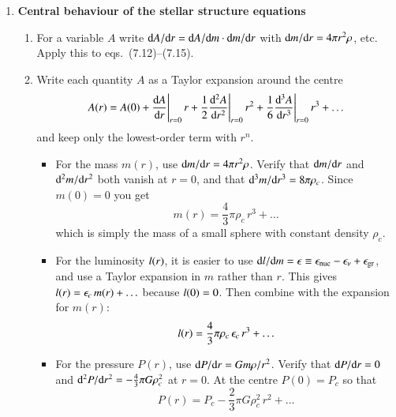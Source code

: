 \documentclass[11pt,a4paper,fleqn]{report}
\begin{document}
\begin{enumerate}
\item {\bf Central behaviour of the stellar structure equations}
  \begin{enumerate}
   
  \item For a variable $A$ write $\mathrm{d} A/\mathrm{d} r = \mathrm{d} A/\mathrm{d} m \cdot
    \mathrm{d} m/\mathrm{d} r$ with $\mathrm{d} m/\mathrm{d} r = 4\pi r^2 \rho$, etc. Apply
    this to eqs.~(7.12)--(7.15).

  \item Write each quantity $A$ as a Taylor expansion around the centre
    \[
    A(r) = A(0) + \frac{\mathrm{d} A}{\mathrm{d} r}\Bigg|_{r=0} \,r
    + \frac{1}{2} \frac{\mathrm{d}^2 A}{\mathrm{d} r^2}\Bigg|_{r=0} \,r^2
    + \frac{1}{6} \frac{\mathrm{d}^3 A}{\mathrm{d} r^3}\Bigg|_{r=0} \,r^3 
    + \dots
    \]
    and keep only the lowest-order term with $r^n$.
    
    \begin {itemize} 

    \item For the mass $m(r)$, use $\mathrm{d} m/\mathrm{d} r = 4\pi r^2 \rho$.
      Verify that $\mathrm{d} m/\mathrm{d} r$ and $\mathrm{d}^2 m/\mathrm{d} r^2$ both vanish
      at $r=0$, and that $\mathrm{d}^3 m/\mathrm{d} r^3 = 8\pi \rho_c$. Since
      $m(0) = 0$ you get
      \[
      m(r) = \frac{4}{3}\pi \rho_c\, r^3 + \ldots
      \]
      which  is simply the mass of a small sphere with constant
      density $\rho_c$.

    \item For the luminosity $l(r)$, it is easier to use
      $\mathrm{d}l/\mathrm{d} m = \epsilon \equiv \epsilon_\mathrm{nuc} -
      \epsilon_\nu + \epsilon_\mathrm{gr}$, and use a Taylor expansion
      in $m$ rather than $r$. This gives $l(r) = \epsilon_c\, m(r)
      + \ldots$ because $l(0) = 0$.  Then combine with the
      expansion for $m(r)$:
      \[
      l(r) = \frac{4}{3}\pi \rho_c\,\epsilon_c\, r^3 + \ldots
      \]

    \item For the pressure $P(r)$, use $\mathrm{d} P/\mathrm{d} r = Gm\rho/r^2$.
      Verify that $\mathrm{d} P/\mathrm{d} r = 0$ and $\mathrm{d}^2 P/\mathrm{d} r^2 =
      -\frac{4}{3}\pi G \rho_c^2$ at $r=0$. At the centre $P(0) = P_c$
      so that
      \[
      P(r) = P_c - \frac{2}{3}\pi G \rho_c^2 \, r^2 + \ldots
      \]


\end{itemize}
\end{enumerate}
\end{enumerate}
\end{document}
